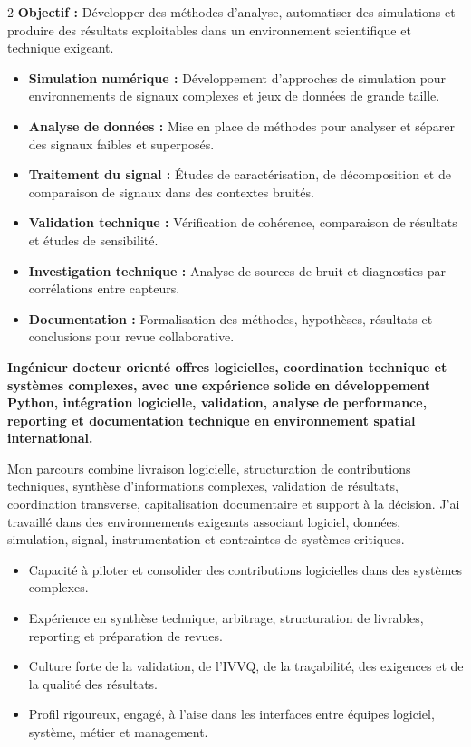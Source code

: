 \documentclass[8pt,a4paper,ragged2e,withhyper]{altacv}
\begin{document}
\begin{paracol}{2}
\textbf{Objectif :} Développer des méthodes d’analyse, automatiser des simulations et produire des résultats exploitables dans un environnement scientifique et technique exigeant.

\begin{itemize}
  \item \textbf{Simulation numérique :} Développement d’approches de simulation pour environnements de signaux complexes et jeux de données de grande taille.
  \item \textbf{Analyse de données :} Mise en place de méthodes pour analyser et séparer des signaux faibles et superposés.
  \item \textbf{Traitement du signal :} Études de caractérisation, de décomposition et de comparaison de signaux dans des contextes bruités.
  \item \textbf{Validation technique :} Vérification de cohérence, comparaison de résultats et études de sensibilité.
  \item \textbf{Investigation technique :} Analyse de sources de bruit et diagnostics par corrélations entre capteurs.
  \item \textbf{Documentation :} Formalisation des méthodes, hypothèses, résultats et conclusions pour revue collaborative.
\end{itemize}

\switchcolumn


\textbf{Ingénieur docteur orienté offres logicielles, coordination technique et systèmes complexes, avec une expérience solide en développement Python, intégration logicielle, validation, analyse de performance, reporting et documentation technique en environnement spatial international.}

Mon parcours combine livraison logicielle, structuration de contributions techniques, synthèse d’informations complexes, validation de résultats, coordination transverse, capitalisation documentaire et support à la décision. J’ai travaillé dans des environnements exigeants associant logiciel, données, simulation, signal, instrumentation et contraintes de systèmes critiques.

\begin{itemize}
  \item Capacité à piloter et consolider des contributions logicielles dans des systèmes complexes.
  \item Expérience en synthèse technique, arbitrage, structuration de livrables, reporting et préparation de revues.
  \item Culture forte de la validation, de l’IVVQ, de la traçabilité, des exigences et de la qualité des résultats.
  \item Profil rigoureux, engagé, à l’aise dans les interfaces entre équipes logiciel, système, métier et management.
\end{itemize}


\end{paracol}
\end{document}
